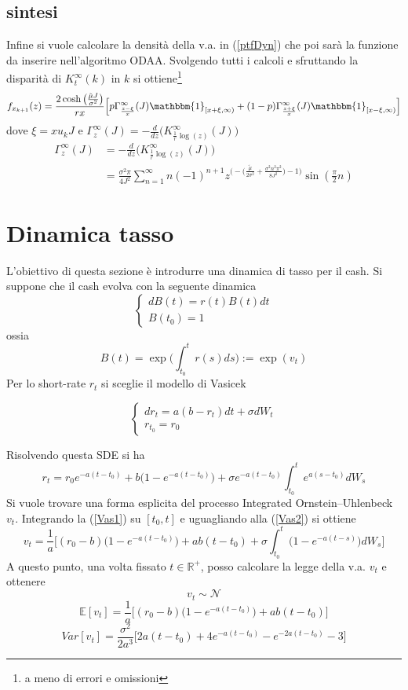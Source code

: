 \documentclass[12pt,a4paper]{article}
\theoremstyle{break}
\begin{document}
\subsection{sintesi}
Infine si vuole calcolare la densità della v.a. in (\ref{ptfDyn}) che poi sarà la funzione da inserire nell'algoritmo ODAA. Svolgendo tutti i calcoli e sfruttando la disparità di $K_t^\infty(k)$ in $k$ si ottiene\footnote{a meno di errori e omissioni}
\begin{equation}
f_{x_{k+1}}(z) = \frac{2\cosh\big(\frac{\tilde{\mu}J}{\sigma^2}\big)}{rx}\Big[p \Gamma^\infty_{\frac{z-\xi}{x}}(J) \mathbbm{1}_{[x+\xi,\infty)} + (1-p)\Gamma^\infty_{\frac{z+\xi}{x}}(J) \mathbbm{1}_{[x-\xi,\infty)}  \Big]
\end{equation}
dove $\xi = x u_k J$ e $\Gamma^\infty_{z}(J) = -\frac{d}{dz}\Big(K^\infty_{\frac{1}{r}\log(z)}(J)\Big)$
\begin{align*}
\Gamma^\infty_{z}(J) &= -\frac{d}{dz}\Big(K^\infty_{\frac{1}{r}\log(z)}(J)\Big)\\
&=\frac{\sigma^2\pi}{4J^2}\sum_{n=1}^{\infty}n(-1)^{n+1}z^{\Big(-\big(\frac{\tilde{\mu}}{2\sigma^2} + \frac{\sigma^2n^2\pi^2}{8J^2}\big)-1\Big)}\sin(\frac{\pi}{2}n)
\end{align*}
\section{Dinamica tasso}
L'obiettivo di questa sezione è introdurre una dinamica di tasso per il cash. Si suppone che il cash evolva con la seguente dinamica 
\[
\begin{cases}
dB(t) = r(t)B(t)dt \\  
B(t_0) = 1
\end{cases}
\]
ossia \[ B(t) = \exp\Big(\int_{t_0}^{t}r(s)ds\Big) := \exp(v_t)\] Per lo short-rate $r_t$ si sceglie il modello di Vasicek

\begin{equation}\label{Vas1}
\begin{cases}
dr_t = a(b - r_t)dt + \sigma dW_t\\
r_{t_0} = r_0
\end{cases}
\end{equation}

Risolvendo questa SDE si ha
\begin{equation}\label{Vas2}
r_t = r_0e^{-a(t-t_0)} + b \big(1-e^{-a(t-t_0)}\big)+\sigma e^{-a (t-t_0)}\int_{t_0}^{t}e^{a(s-t_0)}dW_s
\end{equation}
Si vuole trovare una forma esplicita del processo Integrated Ornstein–Uhlenbeck $v_t$. Integrando la (\ref{Vas1}) su $[t_0,t]$ e uguagliando alla (\ref{Vas2}) si ottiene 
\begin{equation}
	\boxed{v_t = \frac{1}{a}\Big[(r_0 - b)\big(1-e^{-a(t-t_0)}\big)+ab(t-t_0)+\sigma\int_{t_0}^{t}\big(1-e^{-a(t-s)}\big)dW_s  \Big]}
\end{equation}
A questo punto, una volta fissato $t \in \mathbb{R}^+$, posso calcolare la legge della v.a. $v_t$ e ottenere
\[
v_t \sim \mathcal{N}
\]
\[
\mathbb{E}[v_t] = \frac{1}{a}\Big[(r_0 - b)\big(1-e^{-a(t-t_0)}\big)+ab(t-t_0)\Big]
\]
\[
Var[v_t] = \frac{\sigma^2}{2a^3}\Big[2a(t-t_0) + 4e^{-a(t-t_0)}-e^{-2a(t-t_0)}-3\Big]
\]
\end{document}
